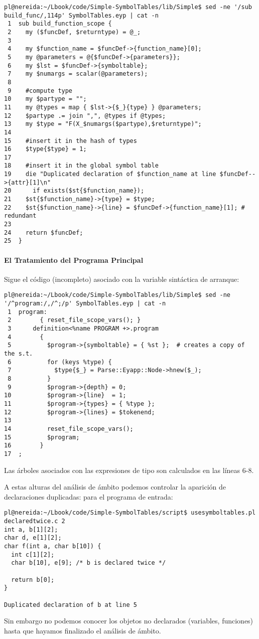\begin{verbatim}
pl@nereida:~/Lbook/code/Simple-SymbolTables/lib/Simple$ sed -ne '/sub build_func/,114p' SymbolTables.eyp | cat -n
 1  sub build_function_scope {
 2    my ($funcDef, $returntype) = @_;
 3
 4    my $function_name = $funcDef->{function_name}[0];
 5    my @parameters = @{$funcDef->{parameters}};
 6    my $lst = $funcDef->{symboltable};
 7    my $numargs = scalar(@parameters);
 8
 9    #compute type
10    my $partype = "";
11    my @types = map { $lst->{$_}{type} } @parameters;
12    $partype .= join ",", @types if @types;
13    my $type = "F(X_$numargs($partype),$returntype)";
14
15    #insert it in the hash of types
16    $type{$type} = 1;
17
18    #insert it in the global symbol table
19    die "Duplicated declaration of $function_name at line $funcDef-->{attr}[1]\n"
20      if exists($st{$function_name});
21    $st{$function_name}->{type} = $type;
22    $st{$function_name}->{line} = $funcDef->{function_name}[1]; # redundant
23
24    return $funcDef;
25  }
\end{verbatim}

\paragraph{El Tratamiento del Programa Principal}
Sigue el código (incompleto) asociado con la variable sintáctica de
arranque:

\begin{verbatim}
pl@nereida:~/Lbook/code/Simple-SymbolTables/lib/Simple$ sed -ne '/^program:/,/^;/p' SymbolTables.eyp | cat -n
 1  program:
 2        { reset_file_scope_vars(); }
 3      definition<%name PROGRAM +>.program
 4        {
 5          $program->{symboltable} = { %st };  # creates a copy of the s.t.
 6          for (keys %type) {
 7            $type{$_} = Parse::Eyapp::Node->hnew($_);
 8          }
 9          $program->{depth} = 0;
10          $program->{line}  = 1;
11          $program->{types} = { %type };
12          $program->{lines} = $tokenend;
13
14          reset_file_scope_vars();
15          $program;
16        }
17  ;
\end{verbatim}
Las árboles asociados con las expresiones de tipo son calculados 
en las líneas 6-8.


A estas alturas del análisis de ámbito podemos controlar
la aparición de declaraciones duplicadas:
para el programa de entrada:
\begin{verbatim}
pl@nereida:~/Lbook/code/Simple-SymbolTables/script$ usesymboltables.pl declaredtwice.c 2
int a, b[1][2];
char d, e[1][2];
char f(int a, char b[10]) {
  int c[1][2];
  char b[10], e[9]; /* b is declared twice */

  return b[0];
}

Duplicated declaration of b at line 5
\end{verbatim}
Sin embargo no podemos conocer los objetos no declarados (variables, funciones)
hasta que hayamos finalizado el análisis de ámbito.

